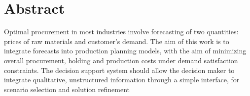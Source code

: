 
\chapter*{Abstract}

Optimal procurement in most industries involve forecasting of two
quantities: prices of raw materials and customer's demand.  The aim of
this work is to integrate forecasts into production planning models,
with the aim of minimizing overall procurement, holding and production
costs under demand satisfaction constraints.  The decision support
system should allow the decision maker to integrate qualitative,
unstructured information through a simple interface, for scenario
selection and solution refinement
